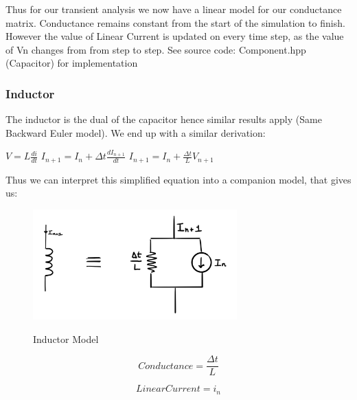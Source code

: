 \documentclass{article}
\begin{document}
\bigbreak 

Thus for our transient analysis we now have a linear model for our conductance matrix. Conductance remains constant from the start of the simulation to finish. However the value of Linear Current is updated on every time step, as the value of Vn changes from from step to step.
\bigbreak 
See source code: Component.hpp (Capacitor) for implementation


\subsubsection{Inductor}
The inductor is the dual of the capacitor hence similar results apply (Same Backward Euler model). We end up with a similar derivation:
\bigbreak

$V = L\frac{di}{dt}$
\medbreak
$I_{n+1} = I_n + \Delta t\frac{dI_{n+1}}{dt}$
\medbreak
$I_{n+1} = I_n + \frac{\Delta t}{L}V_{n+1}$

\bigbreak

Thus we can interpret this simplified equation into a companion model, that gives us: 

\bigbreak

\begin{figure}[h]
    \caption{Inductor Model}
    \centering
    \includegraphics[width=0.7\textwidth]{images/InductorModel.jpg}
    \label{fig:InductorModel}
\end{figure}

\noindent\begin{minipage}{.5\linewidth}
\setcounter{equation}{0}
\begin{equation}
  Conductance = \frac{\Delta t}{L}
\end{equation}
\end{minipage}%
\begin{minipage}{.5\linewidth}
\begin{equation}
  LinearCurrent = i_n
\end{equation}
\end{minipage}
\end{document}
